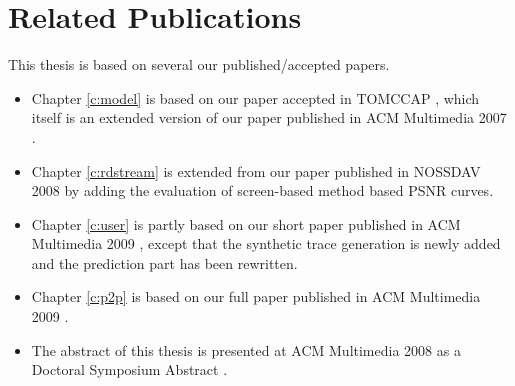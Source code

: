 \documentclass[11pt, a4paper]{report}
\begin{document}
\chapter{Related Publications}
This thesis is based on several our published/accepted papers.
\begin{itemize}
    \item Chapter \ref{c:model} is based on our paper accepted in TOMCCAP \cite{modeling:cheng}, which itself is an extended version of our paper published in ACM Multimedia 2007 \cite{1291399}.
    \item Chapter \ref{c:rdstream} is extended from our paper published in NOSSDAV 2008 \cite{Cheng2008} by adding the evaluation of screen-based method based PSNR curves.
    \item Chapter \ref{c:user} is partly based on our short paper published in ACM Multimedia 2009 \cite{towards:ransi}, except that the synthetic trace generation is newly added and the prediction part has been rewritten. 
    \item Chapter \ref{c:p2p} is based on our full paper published in ACM Multimedia 2009 \cite{peer:cheng}.
    \item The abstract of this thesis is presented at ACM Multimedia 2008 as a Doctoral Symposium Abstract \cite{cheng:streaming}.
\end{itemize}



\end{document}
